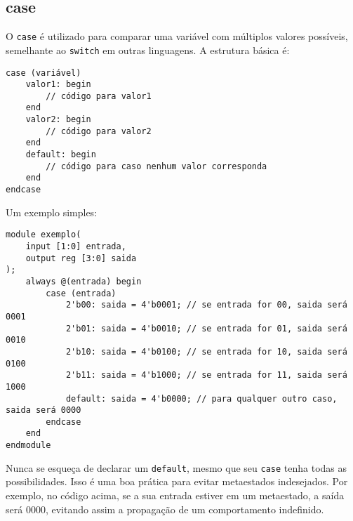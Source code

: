 \documentclass{article}
\begin{document}
\subsection*{case}

O \texttt{case} é utilizado para comparar uma variável com múltiplos valores possíveis, semelhante ao \texttt{switch} em outras linguagens. A estrutura básica é:

\begin{lstlisting}
case (variável)
    valor1: begin
        // código para valor1
    end
    valor2: begin
        // código para valor2
    end
    default: begin
        // código para caso nenhum valor corresponda
    end
endcase
\end{lstlisting}

Um exemplo simples:

\begin{lstlisting}
module exemplo(
    input [1:0] entrada,
    output reg [3:0] saida
);
    always @(entrada) begin
        case (entrada)
            2'b00: saida = 4'b0001; // se entrada for 00, saida será 0001
            2'b01: saida = 4'b0010; // se entrada for 01, saida será 0010
            2'b10: saida = 4'b0100; // se entrada for 10, saida será 0100
            2'b11: saida = 4'b1000; // se entrada for 11, saida será 1000
            default: saida = 4'b0000; // para qualquer outro caso, saida será 0000
        endcase
    end
endmodule
\end{lstlisting}

Nunca se esqueça de declarar um \texttt{default}, mesmo que seu \texttt{case} tenha todas as possibilidades. Isso é uma boa prática para evitar metaestados indesejados. Por exemplo, no código acima, se a sua entrada estiver em um metaestado, a saída será 0000, evitando assim a propagação de um comportamento indefinido.
\end{document}

